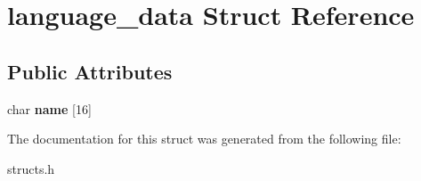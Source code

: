 \hypertarget{structlanguage__data}{\section{language\-\_\-data Struct Reference}
\label{structlanguage__data}
}
\subsection*{Public Attributes}
\begin{DoxyCompactItemize}
\item 
\hypertarget{structlanguage__data_a4addd6b17066b256e8d486053fa48a4e}{char {\bfseries name} \mbox{[}16\mbox{]}}\label{structlanguage__data_a4addd6b17066b256e8d486053fa48a4e}

\end{DoxyCompactItemize}


The documentation for this struct was generated from the following file\-:\begin{DoxyCompactItemize}
\item 
structs.\-h\end{DoxyCompactItemize}
